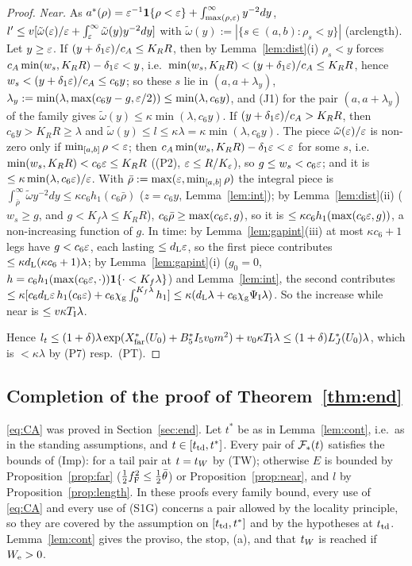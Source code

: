 \begin{proof}
\emph{Near.} As $a^*(\rho)=\varepsilon^{-1}\mathbf 1\{\rho<\varepsilon\}+\int_{\max(\rho,\varepsilon)}^\infty y^{-2}dy$,
$l'\le v[\tilde\omega(\varepsilon)/\varepsilon+\int_\varepsilon^\infty\tilde\omega(y)y^{-2}dy]$ with $\tilde\omega(y):=|\{s\in(a,b):\rho_s<y\}|$ (arclength).
Let $y\ge\varepsilon$. If $(y+\delta_1\varepsilon)/c_A\le K_RR$, then by Lemma~\ref{lem:dist}(i) $\rho_s<y$ forces $c_A\min(w_s,K_RR)-\delta_1\varepsilon<y$, i.e.\
$\min(w_s,K_RR)<(y+\delta_1\varepsilon)/c_A\le K_RR$, hence $w_s<(y+\delta_1\varepsilon)/c_A\le c_6y$; so these $s$ lie in $(a,a+\lambda_y)$,
$\lambda_y:=\min(\lambda,\max(c_6y-g,\varepsilon/2))\le\min(\lambda,c_6y)$, and (J1) for the pair $(a,a+\lambda_y)$ of the family gives
$\tilde\omega(y)\le\kappa\min(\lambda,c_6y)$. If $(y+\delta_1\varepsilon)/c_A>K_RR$, then $c_6y>K_RR\ge\lambda$ and
$\tilde\omega(y)\le l\le\kappa\lambda=\kappa\min(\lambda,c_6y)$. The piece $\tilde\omega(\varepsilon)/\varepsilon$ is non-zero only if $\min_{[a,b]}\rho<\varepsilon$;
then $c_A\min(w_s,K_RR)-\delta_1\varepsilon<\varepsilon$ for some $s$, i.e.\ $\min(w_s,K_RR)<c_6\varepsilon\le K_RR$ ((P2), $\varepsilon\le R/K_\varepsilon$), so $g\le w_s<c_6\varepsilon$;
and it is $\le\kappa\min(\lambda,c_6\varepsilon)/\varepsilon$. With $\bar\rho:=\max(\varepsilon,\min_{[a,b]}\rho)$ the integral piece is
$\int_{\bar\rho}^\infty\tilde\omega y^{-2}dy\le\kappa c_6h_1(c_6\bar\rho)$ ($z=c_6y$, Lemma~\ref{lem:int}); by Lemma~\ref{lem:dist}(ii) ($w_s\ge g$,
and $g<K_f\lambda\le K_RR$), $c_6\bar\rho\ge\max(c_6\varepsilon,g)$, so it is $\le\kappa c_6h_1(\max(c_6\varepsilon,g))$, a non-increasing function of $g$.
In time: by Lemma~\ref{lem:gapint}(iii) at most $\kappa c_6+1$ legs have $g<c_6\varepsilon$, each lasting $\le d_{\mathrm L}\varepsilon$, so the first piece
contributes $\le\kappa d_{\mathrm L}(\kappa c_6+1)\lambda$; by Lemma~\ref{lem:gapint}(i) ($g_0=0$, $h=c_6h_1(\max(c_6\varepsilon,\cdot))\mathbf 1\{\cdot<K_f\lambda\}$)
and Lemma~\ref{lem:int}, the second contributes $\le\kappa[c_6d_{\mathrm L}\varepsilon\,h_1(c_6\varepsilon)+c_6\chi_{\mathrm g}\int_0^{K_f\lambda}h_1]\le\kappa(d_{\mathrm L}\lambda+c_6\chi_{\mathrm g}\Psi_{\mathrm I}\lambda)$.
So the increase while near is $\le v\kappa T_{\mathrm I}\lambda$.

Hence $l_t\le(1+\delta)\lambda\exp(X^*_{\mathrm{far}}(U_0)+B_5^*I_5v_0 m^2)+v_0\kappa T_{\mathrm I}\lambda\le(1+\delta)L^*_J(U_0)\lambda$, which is $<\kappa\lambda$ by
(P7) resp.\ (PT).
\end{proof}

\subsection{Completion of the proof of Theorem~\ref{thm:end}}\label{sec:endproof}

\eqref{eq:CA} was proved in Section~\ref{sec:end}. Let $t^*$ be as in Lemma~\ref{lem:cont}, i.e.\ as in the standing assumptions, and
$t\in[t_{\mathrm{td}},t^*]$. Every pair of $\mathcal F_*(t)$ satisfies the bounds of (Imp): for a tail pair at $t=t_W$ by (TW); otherwise $E$ is bounded by
Proposition~\ref{prop:far} ($\frac12f_{\mathrm F}^2\le\frac12\bar\theta$) or Proposition~\ref{prop:near}, and $l$ by Proposition~\ref{prop:length}. In
these proofs every family bound, every use of \eqref{eq:CA} and every use of (S1G) concerns a pair allowed by the locality principle, so
they are covered by the assumption on $[t_{\mathrm{td}},t^*]$ and by the hypotheses at $t_{\mathrm{td}}$. Lemma~\ref{lem:cont} gives the proviso, the stop, (a),
and that $t_W$ is reached if $W_{\mathrm e}>0$.

